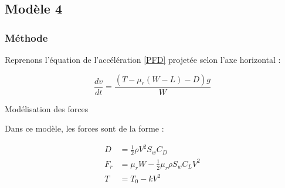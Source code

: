 			
			
			
	
\subsection{Modèle 4}
	
	
	
	\begin{frame}
		
		\frametitle{Méthode}
		
		Reprenons l'équation de l'accélération \ref{PFD} projetée selon l'axe horizontal :
		
		\begin{equation}
			\frac{dv}{dt}
			=
			\frac{\left(T-\mu_r(W-L)-D\right)g}{W}
		\end{equation}
		
	\end{frame}
	
	
	\begin{frame}{Modélisation des forces}
		
		Dans ce modèle, les forces sont de la forme :
		
		\begin{align}
			D &= \frac{1}{2}\rho V^2 S_w C_D \\
			F_r &= \mu_r W - \frac{1}{2}\mu_r \rho S_w C_L V^2 \\
			T &= T_0-kV^2
		\end{align}
		
	\end{frame}
	
	
